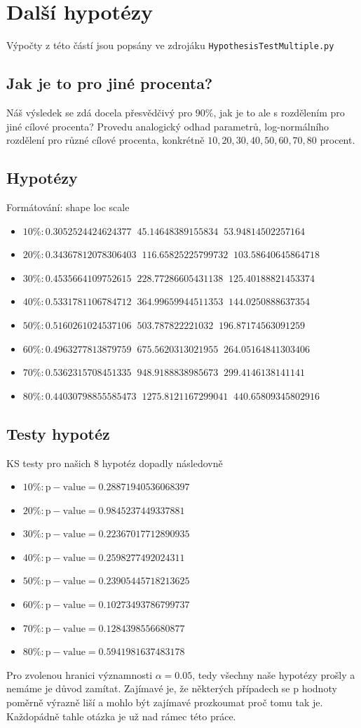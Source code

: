 \documentclass[11pt]{article}
\def\code#1{\texttt{#1}}
\begin{document}
\section{Další hypotézy}
Výpočty z této částí jsou popsány ve zdrojáku \code{HypothesisTestMultiple.py}
\subsection{Jak je to pro jiné procenta?}
Náš výsledek se zdá docela přesvědčivý pro $90\%$, jak je to ale s rozdělením pro jiné cílové procenta? Provedu analogický odhad parametrů, log-normálního rozdělení pro různé cílové procenta, konkrétně $10, 20, 30, 40, 50, 60, 70, 80$ procent.
\subsection{Hypotézy}
Formátování: shape loc scale
\begin{itemize}
	\item $10\%:0.3052524424624377\;\;45.14648389155834\;\;53.94814502257164$
	\item $20\%:0.34367812078306403\;\;116.65825225799732\;\;103.58640645864718$
	\item $30\%:0.4535664109752615\;\;228.77286605431138\;\;125.40188821453374$
	\item $40\%:0.5331781106784712\;\;364.99659944511353\;\;144.0250888637354$
	\item $50\%:0.5160261024537106\;\;503.787822221032\;\;196.87174563091259$
	\item $60\%:0.4963277813879759\;\;675.5620313021955\;\;264.05164841303406$
	\item $70\%:0.5362315708451335\;\;948.9188838985673\;\;299.4146138141141$
	\item $80\%:0.44030798855585473\;\;1275.8121167299041\;\;440.65809345802916$
\end{itemize}
\subsection{Testy hypotéz}
KS testy pro našich 8 hypotéz dopadly následovně
\begin{itemize}
	\item $10\%:\mathrm{p-value}=0.28871940536068397$
	\item $20\%:\mathrm{p-value}=0.9845237449337881$
	\item $30\%:\mathrm{p-value}=0.22367017712890935$
	\item $40\%:\mathrm{p-value}=0.2598277492024311$
	\item $50\%:\mathrm{p-value}=0.23905445718213625$
	\item $60\%:\mathrm{p-value}=0.10273493786799737$
	\item $70\%:\mathrm{p-value}=0.1284398556680877$
	\item $80\%:\mathrm{p-value}=0.5941981637483178$
\end{itemize}
Pro zvolenou hranici významnosti $\alpha=0.05$, tedy všechny naše hypotézy prošly a nemáme je důvod zamítat. Zajímavé je, že některých případech se p hodnoty poměrně výrazně liší a mohlo být zajímavé prozkoumat proč tomu tak je. Každopádně tahle otázka je už nad rámec této práce.
\end{document}
